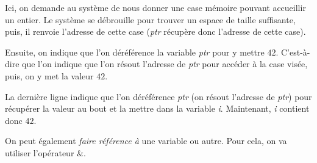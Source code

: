 \documentclass[11pt,a4paper]{article}
\begin{document}
\bigskip

Ici, on demande au système de nous donner une case mémoire pouvant accueillir un entier.
Le système se débrouille pour trouver un espace de taille suffisante, puis, il renvoie l'adresse de cette case (\textit{ptr} récupère donc l'adresse de cette case).

Ensuite, on indique que l'on déréférence la variable \textit{ptr} pour y mettre $ 42 $.
C'est-à-dire que l'on indique que l'on résout l'adresse de \textit{ptr} pour accéder à la case visée, puis, on y met la valeur $ 42 $.

La dernière ligne indique que l'on déréférence \textit{ptr} (on résout l'adresse de \textit{ptr}) pour récupérer la valeur au bout et la mettre dans la variable \textit{i}.
Maintenant, \textit{i} contient donc $ 42 $.

\bigskip

On peut également \textit{faire référence à} une variable ou autre.
Pour cela, on va utiliser l'opérateur $ \& $.
\end{document}
